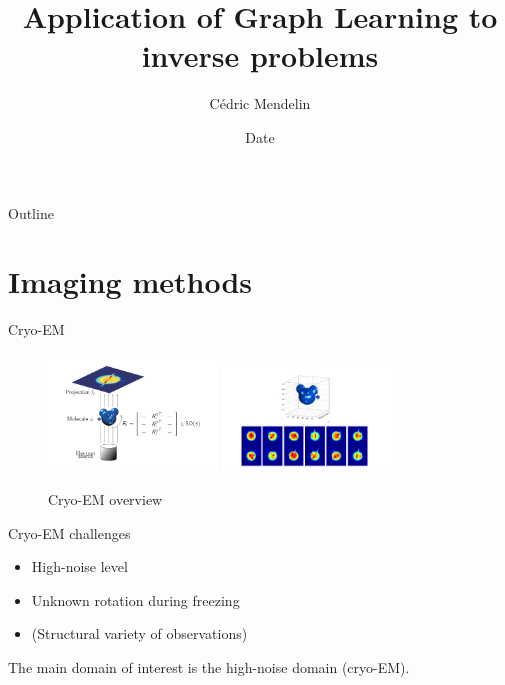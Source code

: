\documentclass[aspectratio=169]{beamer}
\title              {Application of Graph Learning to inverse problems}
\author     		{Cédric Mendelin}
\institute          {Department of Mathematics and Computer Science, University of Basel}
\date               {Date}
\begin{document}
\begin{frame}[t,plain]
    \titlepage
\end{frame}

\begin{frame}[t]{Outline}
    \tableofcontents
\end{frame}


\section{Imaging methods}	%

\begin{frame}[c]{Cryo-EM}
    \begin{figure}
        \includegraphics[width=0.4\textwidth]{cryo-EM-overview.png}
        \includegraphics[width=0.4\textwidth]{micky-mouse.png}
        \caption{Cryo-EM overview \cite[Figure 1 and Figure 2]{cryoEmMath2}}
    \end{figure}

\end{frame}

\begin{frame}[c]{Cryo-EM challenges}
    \begin{itemize}
        \item High-noise level 
        \item Unknown rotation during freezing
        \item (Structural variety of observations)
    \end{itemize}

    
\begin{tcolorbox}[colback=red!5!white,colframe=red!75!black]
    The main domain of interest is the high-noise domain (cryo-EM).
\end{tcolorbox}

\end{frame}
\end{document}
